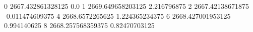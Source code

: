 0 2667.432861328125 0.0
1 2669.649658203125 2.216796875
2 2667.42138671875 -0.011474609375
4 2668.6572265625 1.224365234375
6 2668.427001953125 0.994140625
8 2668.257568359375 0.82470703125
